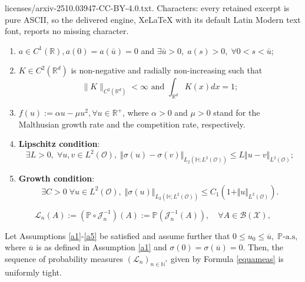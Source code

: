 \documentclass[10pt,a4paper]{amsart}
\begin{document}
licenses/arxiv-2510.03947-CC-BY-4.0.txt. Characters: every retained excerpt is pure ASCII, so the delivered engine, XeLaTeX with its default Latin Modern text font, reports no missing character.
\begin{enumerate}[label={({A${{_\arabic*}}$})}]
	\item \label{a1} $a \in C^1(\mathbb{R}), a(0)=a(\bar{u})=0$ and $\exists \bar{u}>0,\; a(s)>0,\; \forall 0<s<\bar{u}$;
	\item \label{a2}  $K \in C^2\left(\mathbb{R}^d\right)$ is  non-negative and radially non-increasing such that $$\|K\|_{C^2\left(\mathbb{R}^d\right)}<\infty \text{ and } \displaystyle \int_{\mathbb{R}^d} K(x) dx=1;$$
	\item \label{a3} $f(u):=\alpha u-\mu u^2, \forall u \in \mathbb{R}^+$, where $\alpha>0$ and $\mu>0$ stand for the Malthusian growth rate and the competition rate, respectively. 
\end{enumerate}

\begin{enumerate}[label={({A${{_\arabic*}}$})}]
	\setcounter{enumi}{3}
	\item \label{a4} \textbf{Lipschitz condition}: 
	$$\exists L>0,\; \forall u,v \in L^2(\mathcal{O}),\; \Vert \sigma(u)-\sigma(v) \Vert_{L_2(\mathbb{H};L^2(\mathcal{O}))} \leq L \Vert u-v \Vert_{L^2(\mathcal{O})};$$ 
	\item \label{a5} \textbf{Growth condition}:
	$$\exists C>0\; \forall u \in L^2(\mathcal{O}),\; \Vert \sigma(u) \Vert_{L_2(\mathbb{H};L^2(\mathcal{O}))} \leq C_1 \left(1+\Vert u\Vert_{L^2(\mathcal{O})}\right).$$
\end{enumerate}

\begin{equation}\label{equameas}
	\mathscr{L}_n(A):=\left(\mathbb{P}\circ \mathscr{J}_n^{-1}\right)(A):=\mathbb{P}\left( \mathscr{J}_n^{-1}(A)\right), \quad \forall A \in \mathcal{B}(\mathscr{X}),
\end{equation}

\begin{lem}\label{tight}
	Let Assumptions \ref{a1}-\ref{a5} be satisfied and assume further that $0 \leq u_0 \leq \overline{u},\; \mathbb{P}\text{-a.s},$ where $\overline{u}$ is as defined in Assumption \ref{a1} and $\sigma(0)=\sigma(\overline{u})=0$. Then, the sequence of probability measures $\left(\mathscr{L}_n\right)_{n \in \mathbb{N}^*}$ given by Formula \eqref{equameas} is uniformly tight.
\end{lem}
\end{document}

